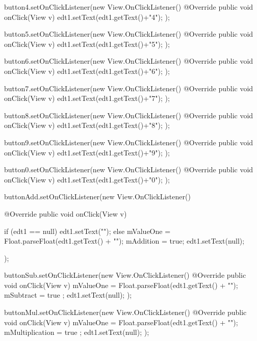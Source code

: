 \documentclass{fisatproject}
\begin{document}
{{        button4.setOnClickListener(new View.OnClickListener() {
            @Override
            public void onClick(View v) {
                edt1.setText(edt1.getText()+"4");
            }
        });
 
        button5.setOnClickListener(new View.OnClickListener() {
            @Override
            public void onClick(View v) {
                edt1.setText(edt1.getText()+"5");
            }
        });
 
        button6.setOnClickListener(new View.OnClickListener() {
            @Override
            public void onClick(View v) {
                edt1.setText(edt1.getText()+"6");
            }
        });
 
        button7.setOnClickListener(new View.OnClickListener() {
            @Override
            public void onClick(View v) {
                edt1.setText(edt1.getText()+"7");
            }
        });
 
        button8.setOnClickListener(new View.OnClickListener() {
            @Override
            public void onClick(View v) {
                edt1.setText(edt1.getText()+"8");
            }
        });
 
        button9.setOnClickListener(new View.OnClickListener() {
            @Override
            public void onClick(View v) {
                edt1.setText(edt1.getText()+"9");
            }
        });
 
        button0.setOnClickListener(new View.OnClickListener() {
            @Override
            public void onClick(View v) {
                edt1.setText(edt1.getText()+"0");
            }
        });
 
        buttonAdd.setOnClickListener(new View.OnClickListener() {
            @Override
            public void onClick(View v) {
 
                if (edt1 == null){
                    edt1.setText("");
                }else {
                    mValueOne = Float.parseFloat(edt1.getText() + "");
                    mAddition = true;
                    edt1.setText(null);
                }
            }
        });
 
        buttonSub.setOnClickListener(new View.OnClickListener() {
            @Override
            public void onClick(View v) {
                mValueOne = Float.parseFloat(edt1.getText() + "");
                mSubtract = true ;
                edt1.setText(null);
            }
        });
 
        buttonMul.setOnClickListener(new View.OnClickListener() {
            @Override
            public void onClick(View v) {
                mValueOne = Float.parseFloat(edt1.getText() + "");
                mMultiplication = true ;
                edt1.setText(null);
            }
        });
 
}}
\end{document}
